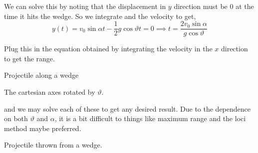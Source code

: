 \begin{exc}
\begin{solution}
        We can solve this by noting that the displacement in \(y\) direction must be \(0\) at the time 
        it hits the wedge. So we integrate and the velocity to get, 
            \begin{equation*}
                y(t) = v_0\sin\alpha t - \frac{1}{2}g\cos\vartheta t = 0 \implies t = \frac{2v_0\sin\alpha}{g\cos\vartheta} 
            \end{equation*}
        
        Plug this in the equation obtained by integrating the velocity in the \(x\) direction to get the range.
    \end{solution}
\end{exc}

\begin{marginfigure}
    \vspace{-45em}
    \centering
    \caption{Projectile along a wedge}
    \label{fig: projectilealongwedge}
\end{marginfigure}


\begin{marginfigure}
    \vspace{-15em}
    \centering
    \caption{The cartesian axes rotated by \(\vartheta\).}
    \label{fig: projectilerotatedaxes}
\end{marginfigure}

and we may solve each of these to get any desired result. Due to the dependence 
on both \(\vartheta\) and \(\alpha\), it is a bit difficult to things like maximum range
and the loci method maybe preferred.  

\begin{marginfigure}
    \vspace{2em}
    \centering
    \caption{Projectile thrown from a wedge.}
    \label{fig: projectile wedge example}
\end{marginfigure}

